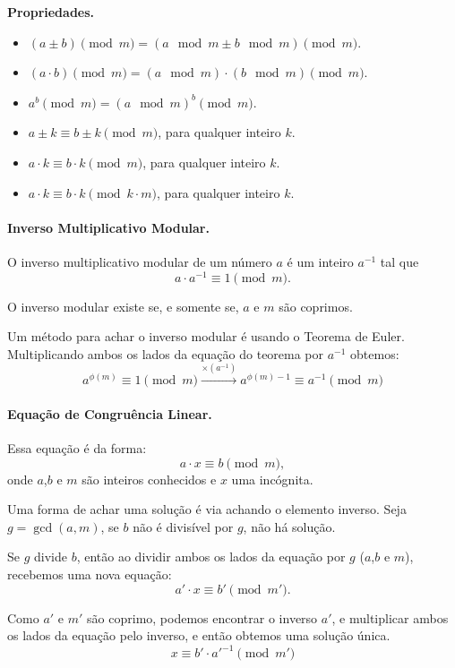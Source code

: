 \textbf{Propriedades.}
\begin{multicols}{2}
    \begin{itemize}
        \item $(a \pm b) \pmod m = (a \mod m \pm b \mod m) \pmod m$.
        \item $(a \cdot b) \pmod m = (a \mod m)\cdot(b\mod m) \pmod m$.
        \item $a^b \pmod m = (a \mod m)^b \pmod m$.
        \item $a \pm k \equiv b \pm k \pmod m$, para qualquer inteiro $k$.
        \item $a \cdot k \equiv b \cdot k \pmod m$, para qualquer inteiro $k$.
        \item $a \cdot k \equiv b \cdot k \pmod {k\cdot m}$, para qualquer inteiro $k$.
    \end{itemize}
    
\end{multicols}

\paragraph{Inverso Multiplicativo Modular.} O inverso multiplicativo modular de um número $a$ é um inteiro $a^{-1}$ tal que
$$a\cdot a^{-1} \equiv 1 \pmod m.$$

O inverso modular existe se, e somente se, $a$ e $m$ são coprimos.

Um método para achar o inverso modular é usando o Teorema de Euler. Multiplicando ambos os lados da equação do teorema por $a^{-1}$ obtemos:
$$a^{\phi(m)} \equiv 1 \pmod m \xrightarrow{\times (a^{-1})} a^{\phi(m)-1} \equiv a^{-1} \pmod m$$

\paragraph{Equação de Congruência Linear.} Essa equação é da forma:
$$a\cdot x \equiv b \pmod m,$$
onde $a$,$b$ e $m$ são inteiros conhecidos e $x$ uma incógnita.

Uma forma de achar uma solução é via achando o elemento inverso. Seja $g = \gcd(a,m)$, se $b$ não é divisível por $g$, não há solução. 

Se $g$ divide $b$, então ao dividir ambos os lados da equação por $g$ ($a$,$b$ e $m$), recebemos uma nova equação:
$$a'\cdot x \equiv b' \pmod{m'}.$$

Como $a'$ e $m'$ são coprimo, podemos encontrar o inverso $a'$, e multiplicar ambos os lados da equação pelo inverso, e então obtemos uma solução única.
$$x \equiv b'\cdot a'^{-1} \pmod{m'}$$

